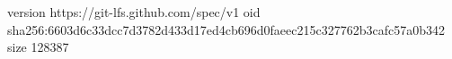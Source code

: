 version https://git-lfs.github.com/spec/v1
oid sha256:6603d6c33dcc7d3782d433d17ed4cb696d0faeec215c327762b3cafc57a0b342
size 128387
